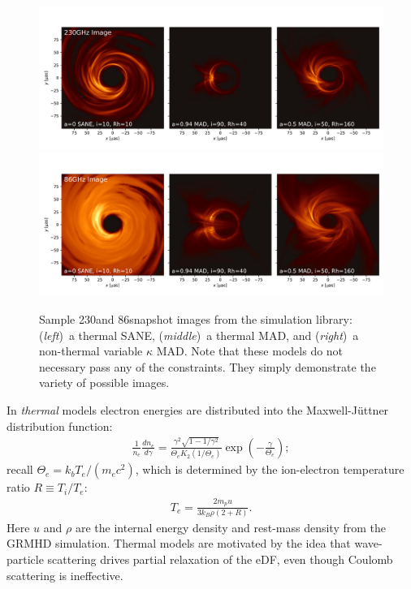 \begin{figure}
  \centering
  \includegraphics[width=\textwidth,trim=0 24 0 24]{figures/sample_230GHz.pdf}\\
  \includegraphics[width=\textwidth,trim=0 24 0 24]{figures/sample_86GHz.pdf}
  \caption{Sample 230\GHz and 86\GHz snapshot images from the simulation library:
    (\emph{left})~a thermal SANE,
    (\emph{middle})~a thermal MAD, and
    (\emph{right})~a non-thermal variable $\kappa$ MAD.
    Note that these models do not necessary pass any of the constraints.
    They simply demonstrate the variety of possible images.}
  \label{fig:sample_imgs}
\end{figure}

\label{sec:eDF}

In \emph{thermal} models electron energies are distributed into the Maxwell-J{\"u}ttner distribution function:
\begin{align}
  \frac{1}{n_e}\frac{dn_e}{d\gamma} = \frac{\gamma^2 \sqrt{1-1/\gamma^2}} {\Theta_e K_2(1/\Theta_e)} \exp\left(-\frac{\gamma}{\Theta_e}\right);
\end{align}
recall $\Theta_e = k_b T_e/(m_e c^2)$, which is determined by the ion-electron temperature ratio $R \equiv T_i/T_e$:
\begin{align}
  T_e=\frac{2 m_p u}{3 k_B \rho (2+R)}.
\end{align}
Here $u$ and $\rho$ are the internal energy density and rest-mass density from the GRMHD simulation.
Thermal models are motivated by the idea that wave-particle scattering drives partial relaxation of the eDF, even though Coulomb scattering is ineffective.

